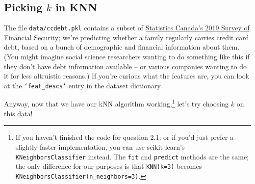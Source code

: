 \documentclass{article}
\begin{document}
\pagebreak

\subsection{Picking $k$ in KNN}
The file \texttt{data/ccdebt.pkl} contains a subset of \href{https://www23.statcan.gc.ca/imdb/p2SV.pl?Function=getSurvey&SDDS=2620}{Statistics Canada's 2019 Survey of Financial Security}; we're predicting whether a family regularly carries credit card debt, based on a bunch of demographic and financial information about them. (You might imagine social science researchers wanting to do something like this if they don't have debt information available -- or various companies wanting to do it for less altruistic reasons.) If you're curious what the features are, you can look at the \texttt{`feat\_descs'} entry in the dataset dictionary.

Anyway, now that we have our kNN algorithm working,\footnote{If you haven't finished the code for question 2.1, or if you'd just prefer a slightly faster implementation, you can use scikit-learn's \texttt{KNeighborsClassifier} instead. The \texttt{fit} and \texttt{predict} methods are the same; the only difference for our purposes is that \texttt{KNN(k=3)} becomes \texttt{KNeighborsClassifier(n\_neighbors=3)}.} let's try choosing $k$ on this data!
\end{document}
